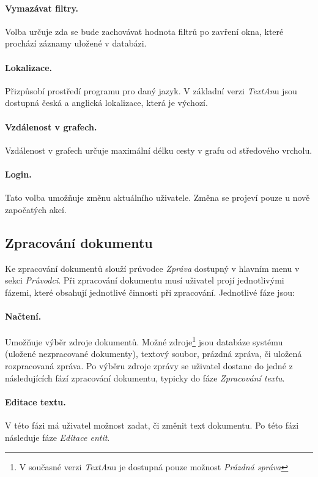 \documentclass[12pt,a4paper]{report}
\newcommand{\textan}{\emph{TextAn}}
\begin{document}
\paragraph{Vymazávat filtry.}
Volba určuje zda se bude zachovávat hodnota filtrů po zavření okna, které prochází záznamy uložené v databázi.

\paragraph{Lokalizace.}
Přizpůsobí prostředí programu pro daný jazyk. V základní verzi \textan u jsou dostupná česká a anglická lokalizace, která je výchozí.

\paragraph{Vzdálenost v grafech.}
Vzdálenost v grafech určuje maximální délku cesty v grafu od středového vrcholu. 

\paragraph{Login.}
Tato volba umožňuje změnu aktuálního uživatele. Změna se projeví pouze u nově započatých akcí.

\subsection{Zpracování dokumentu}
Ke zpracování dokumentů slouží průvodce \emph{Zpráva} dostupný v hlavním menu v sekci \emph{Průvodci}. Při zpracování dokumentu musí uživatel projí jednotlivými fázemi, které obsahují jednotlivé činnosti při zpracování. Jednotlivé fáze jsou:

\paragraph{Načtení.}
Umožňuje výběr zdroje dokumentů. Možné zdroje\footnote{V současné verzi \textan u je dostupná pouze možnost \emph{Prázdná správa}} jsou databáze systému (uložené nezpracované dokumenty), textový soubor, prázdná zpráva, či uložená rozpracovaná zpráva. Po výběru zdroje zprávy se uživatel dostane do jedné z následujících fází zpracování dokumentu, typicky do fáze \emph{Zpracování textu}.

\paragraph{Editace textu.}
V této fázi má uživatel možnost zadat, či změnit text dokumentu. Po této fázi následuje fáze \emph{Editace entit}.
\end{document}
